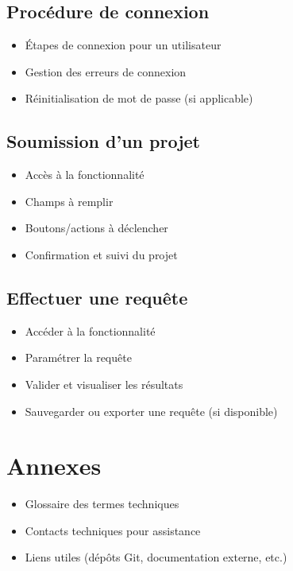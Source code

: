\documentclass[12pt]{article}
\begin{document}
        \subsection{Procédure de connexion}
            \begin{itemize}[label=--]
                \item Étapes de connexion pour un utilisateur
                \item Gestion des erreurs de connexion
                \item Réinitialisation de mot de passe (si applicable)
            \end{itemize}
        \subsection{Soumission d’un projet}
            \begin{itemize}[label=--]
                \item Accès à la fonctionnalité
                \item Champs à remplir
                \item Boutons/actions à déclencher
                \item Confirmation et suivi du projet
            \end{itemize}
        \subsection{Effectuer une requête}
            \begin{itemize}[label=--]
                \item Accéder à la fonctionnalité
                \item Paramétrer la requête
                \item Valider et visualiser les résultats
                \item Sauvegarder ou exporter une requête (si disponible)
            \end{itemize}

    \section*{Annexes}
            \begin{itemize}[label=--]
            \item Glossaire des termes techniques
            \item Contacts techniques pour assistance
            \item Liens utiles (dépôts Git, documentation externe, etc.)
        \end{itemize}
\end{document}
